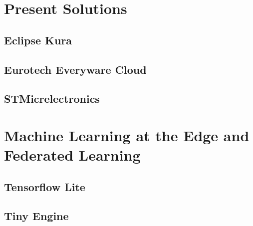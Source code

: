 \section{Present Solutions}

\subsection{Eclipse Kura}

\subsection{Eurotech Everyware Cloud}

\subsection{STMicrelectronics}

\section{Machine Learning at the Edge and Federated Learning} 

\subsection{Tensorflow Lite}

\subsection{Tiny Engine}

